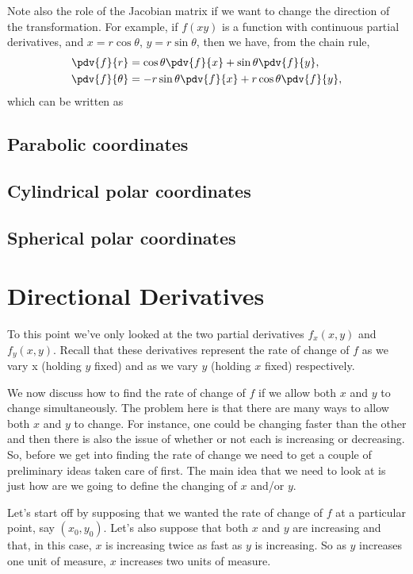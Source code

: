 Note also the role of the Jacobian matrix if we want to change the direction of the transformation. For example, if $f(x y)$ is a function with continuous partial derivatives, and $x=r\cos\theta$, $y=r\sin\theta$, then we have, from the chain rule,
\begin{align*}
\pdv{f}{r}&=\cos\theta\pdv{f}{x}+\sin\theta\pdv{f}{y},\\
\pdv{f}{\theta}&=-r\sin\theta\pdv{f}{x}+r\cos\theta\pdv{f}{y},
\end{align*}
which can be written as


\subsection{Parabolic coordinates}

\subsection{Cylindrical polar coordinates}

\subsection{Spherical polar coordinates}


\pagebreak

\section{Directional Derivatives}
To this point we've only looked at the two partial derivatives $f_x(x,y)$ and $f_y(x,y)$. Recall that these derivatives represent the rate of change of $f$ as we vary x (holding $y$ fixed) and as we vary $y$ (holding $x$ fixed) respectively. 

We now discuss how to find the rate of change of $f$ if we allow both $x$ and $y$ to change simultaneously. The problem here is that there are many ways to allow both $x$ and $y$ to change. For instance, one could be changing faster than the other and then there is also the issue of whether or not each is increasing or decreasing. So, before we get into finding the rate of change we need to get a couple of preliminary ideas taken care of first. The main idea that we need to look at is just how are we going to define the changing of $x$ and/or $y$.

Let's start off by supposing that we wanted the rate of change of $f$ at a particular point, say $(x_0,y_0)$. Let's also suppose that both $x$ and $y$ are increasing and that, in this case, $x$ is increasing twice as fast as $y$ is increasing. So as $y$ increases one unit of measure, $x$ increases two units of measure.

